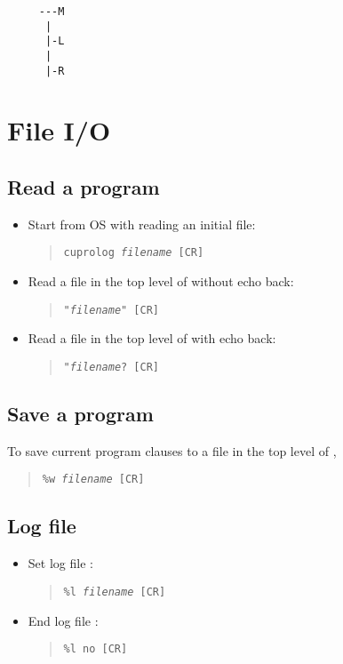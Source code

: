 \begin{verbatim}
     ---M
      |
      |-L
      |
      |-R
\end{verbatim}

\section{File I/O}
\subsection{Read a program}
\begin{itemize}
\item Start \cuprolog from OS with reading an initial file:
\begin{quote}
	{\tt cuprolog {\em filename} [CR]}
\end{quote}
\item Read a file in the top level of \cuprolog without echo back:
\begin{quote}
	{\tt "{\em filename}" [CR] }
\end{quote}
\item Read a file in the top level of \cuprolog with echo back:
\begin{quote}
	{\tt "{\em filename}? [CR] }
\end{quote}
\end{itemize}

\subsection{Save a program}
To save current program clauses to a file in the top level of \cuprolog,
\begin{quote}
	{\tt \%w {\em filename} [CR]}
\end{quote}

\subsection{Log file}
\begin{itemize}
\item Set log file : 
\begin{quote}
	{\tt \%l {\em filename} [CR]}
\end{quote}
\item End log file :
\begin{quote}
	{\tt \%l no [CR]}
\end{quote}
\end{itemize}


